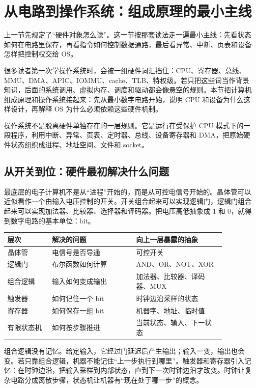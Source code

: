 \section{从电路到操作系统：组成原理的最小主线}

上一节先规定了“硬件对象怎么读”。这一节按那套读法走一遍最小主线：先看状态如何在电路里保存，再看指令如何控制数据通路，最后看异常、中断、页表和设备怎样把控制权交给 OS。

很多读者第一次学操作系统时，会被一组硬件词汇挡住：CPU、寄存器、总线、MMU、DMA、APIC、IOMMU、cache、TLB、特权级。若只把这些词当作背景知识，后面的系统调用、虚拟内存、调度和驱动都会像悬空的规则。本节把计算机组成原理和操作系统接起来：先从最小数字电路开始，说明 CPU 和设备为什么这样设计，再解释 OS 为什么必须依赖这些硬件机制。

\begin{keyidea}
操作系统不是脱离硬件单独存在的一层规则。它是运行在受保护 CPU 模式下的一段程序，利用中断、异常、页表、定时器、总线、设备寄存器和 DMA，把原始硬件状态组织成进程、地址空间、文件和 socket。
\end{keyidea}

\subsection{从开关到位：硬件最初解决什么问题}

最底层的电子计算机不是从“进程”开始的，而是从可控电信号开始的。晶体管可以近似看作一个由输入电压控制的开关。开关组合起来可以实现逻辑门，逻辑门组合起来可以实现加法器、比较器、选择器和译码器。把电压高低抽象成 1 和 0，就得到数字电路的基本单位：bit。

\begin{longtable}{p{0.18\linewidth}p{0.34\linewidth}p{0.36\linewidth}}
\toprule
层次 & 解决的问题 & 向上一层暴露的抽象 \\
\midrule
晶体管 & 电信号是否导通 & 可控开关 \\
逻辑门 & 布尔函数如何计算 & AND、OR、NOT、XOR \\
组合逻辑 & 输入如何变成输出 & 加法器、比较器、译码器、MUX \\
触发器 & 如何记住一个 bit & 时钟边沿采样的状态 \\
寄存器 & 如何保存一组 bit & 机器字、地址、临时值 \\
有限状态机 & 如何按步骤推进 & 当前状态、输入、下一状态 \\
\bottomrule
\end{longtable}

组合逻辑没有记忆。给定输入，它经过门延迟后产生输出；输入一变，输出也会变。若只靠组合逻辑，机器不能记住“上一步执行到哪里”。触发器和寄存器引入记忆：在时钟边沿，把输入采样到内部状态，直到下一次时钟边沿才改变。时钟让复杂电路分成离散步骤，状态机让机器有“现在处于哪一步”的概念。

